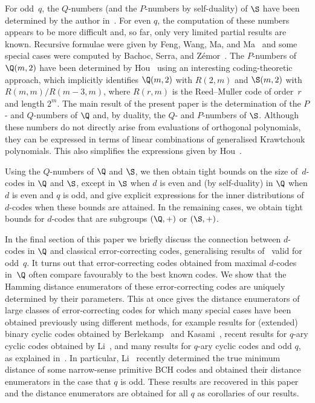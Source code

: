 For odd~$q$, the $Q$-numbers (and the $P$-numbers by self-duality) of $\S$ have been determined by the author in~\cite{Sch2015}. For even $q$, the computation of these numbers appears to be more difficult and, so far, only very limited partial results are known. Recursive formulae were given by Feng, Wang, Ma, and Ma~\cite{FenWanMaMa2008} and some special cases were computed by Bachoc, Serra, and Z\'emor~\cite{BacSerZem2017}. The $P$-numbers of $\Q(m,2)$ have been determined by Hou~\cite{Hou2001} using an interesting coding-theoretic approach, which implicitly identifies $\Q(m,2)$ with $R(2,m)$ and $\S(m,2)$ with $R(m,m)/R(m-3,m)$, where $R(r,m)$ is the Reed--Muller code of order~$r$ and length $2^m$. The main result of the present paper is the determination of the $P$- and $Q$-numbers of $\Q$ and, by duality, the $Q$- and $P$-numbers of $\S$. Although these numbers do not directly arise from evaluations of orthogonal polynomials, they can be expressed in terms of linear combinations of generalised Krawtchouk polynomials. This also simplifies the expressions given by Hou~\cite{Hou2001}.
\par
Using the $Q$-numbers of $\Q$ and $\S$, we then obtain tight bounds on the size of~$d$-codes in $\Q$ and $\S$, except in $\S$ when $d$ is even and (by self-duality) in $\Q$ when $d$ is even and $q$ is odd, and give explicit expressions for the inner distributions of $d$-codes when these bounds are attained. In the remaining cases, we obtain tight bounds for $d$-codes that are subgroups $(\Q,+)$ or $(\S,+)$.
\par
In the final section of this paper we briefly discuss the connection between $d$-codes in $\Q$ and classical error-correcting codes, generalising results of~\cite{Sch2015} valid for odd~$q$. 
It turns out that error-correcting codes obtained from maximal $d$-codes in~$\Q$ often compare favourably to the best known codes. We show that the Hamming distance enumerators of these error-correcting codes are uniquely determined by their parameters. This at once gives the distance enumerators of large classes of error-correcting codes 
for which many special cases have been obtained previously using different methods, for example results for (extended) binary cyclic codes obtained by Berlekamp~\cite{Ber1970} and Kasami~\cite{Kas1971}, recent results for $q$-ary cyclic codes obtained by Li~\cite{Li2017}, and many results for $q$-ary cyclic codes and odd $q$, as explained in~\cite{Sch2015}. In particular, Li~\cite{Li2017} recently determined the true minimum distance of some narrow-sense primitive BCH codes and obtained their distance enumerators in the case that $q$ is odd. These results are recovered in this paper and the distance enumerators are obtained for all $q$ as corollaries of our results.

